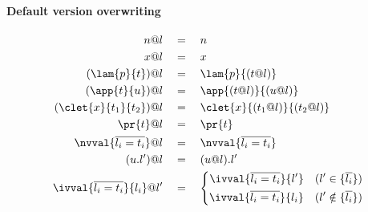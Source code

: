 \paragraph{\textnormal{\textbf{Default version overwriting}}}
\begin{align*}
n@l \quad&=\quad n\\
x@l \quad&=\quad x\\
(\lam{p}{t})@l \quad&=\quad \lam{p}{(t@l)}\\
(\app{t}{u})@l \quad&=\quad \app{(t@l)}{(u@l)}\\
(\clet{x}{t_1}{t_2})@l \quad&=\quad \clet{x}{(t_1@l)}{(t_2@l)}\\
\pr{t}@l \quad&=\quad \pr{t}\\
\nvval{\overline{l_i=t_i}}@l \quad&=\quad \nvval{\overline{l_i=t_i}}\\
(u.l')@l \quad&=\quad (u@l).l'\\
\ivval{\overline{l_i=t_i}}{l_i}@l' \quad&=\quad \left\{ 
\begin{aligned}
\ivval{\overline{l_i=t_i}}{l'} \quad (l' \in \{\overline{l_i}\})\\
\ivval{\overline{l_i=t_i}}{l_i} \quad (l' \notin \{\overline{l_i}\})
\end{aligned}
\right.
\end{align*}
